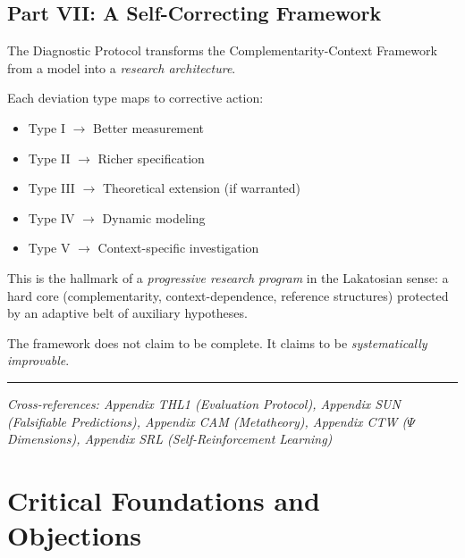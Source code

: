 \subsection{Part VII: A Self-Correcting Framework}

The Diagnostic Protocol transforms the Complementarity-Context Framework 
from a model into a \textit{research architecture}.

\begin{center}
\end{center}

Each deviation type maps to corrective action:
\begin{itemize}
    \item Type I $\rightarrow$ Better measurement
    \item Type II $\rightarrow$ Richer specification
    \item Type III $\rightarrow$ Theoretical extension (if warranted)
    \item Type IV $\rightarrow$ Dynamic modeling
    \item Type V $\rightarrow$ Context-specific investigation
\end{itemize}

This is the hallmark of a \textit{progressive research program} in the Lakatosian 
sense: a hard core (complementarity, context-dependence, reference structures) 
protected by an adaptive belt of auxiliary hypotheses.

The framework does not claim to be complete. It claims to be 
\textit{systematically improvable}.

\vspace{1em}
\hrule
\vspace{0.5em}
\noindent\textit{Cross-references: Appendix THL1 (Evaluation Protocol), 
Appendix SUN (Falsifiable Predictions), Appendix CAM (Metatheory), 
Appendix CTW ($\Psi$ Dimensions), Appendix SRL (Self-Reinforcement Learning)}




\section{Critical Foundations and Objections}
\label{sec:eps-foundations}

